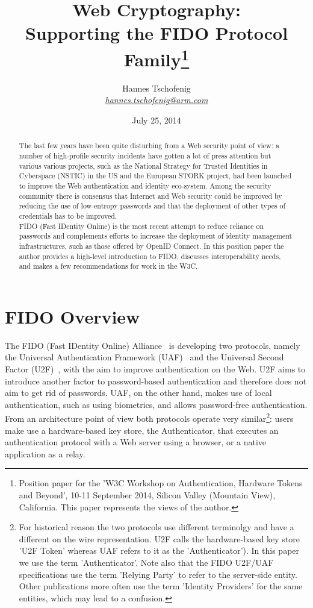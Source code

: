 \documentclass[peerreview, a4paper, 7pt]{IEEEtran}
\title{Web Cryptography: \\Supporting the FIDO Protocol Family\thanks{Position paper for the 'W3C Workshop on Authentication, Hardware Tokens and Beyond', 10-11 September 2014, Silicon Valley (Mountain View), California. This paper represents the views of the author.}}
\author{Hannes Tschofenig\\\textit{\href{mailto:hannes.tschofenig@arm.com}{hannes.tschofenig@arm.com}}}
\date{July 25, 2014}
\begin{document}
\maketitle


\begin{abstract}

The last few years have been quite disturbing from a Web security point of view: a number of high-profile security incidents have gotten a lot
of press attention but various various projects, such as the National Strategy for Trusted Identities in Cyberspace (NSTIC) in the US and the 
European STORK project, had been launched to improve the Web authentication and identity eco-system. Among the security community there is 
consensus that Internet and Web security could be improved by reducing the use of low-entropy passwords and that the deployment of other 
types of credentials has to be improved. \\

FIDO (Fast IDentity Online) is the most recent attempt to reduce reliance on passwords and complements efforts to increase the deployment of 
identity management infrastructures, such as those offered by OpenID Connect. In this position paper the author provides a high-level 
introduction to FIDO, discusses interoperability needs, and makes a few recommendations for work in the W3C. 

\end{abstract}

\section{FIDO Overview}

The FIDO (Fast IDentity Online) Alliance~\cite{fido} is developing two protocols, namely the Universal Authentication Framework (UAF)~\cite{uaf} and the Universal Second Factor (U2F)~\cite{u2f}, with the aim to improve authentication on the Web. U2F aims to introduce another factor to password-based authentication and therefore does not aim to get rid of passwords. UAF, on the other hand, makes use of local authentication, such as using biometrics, and allows password-free authentication. From an architecture point of view both protocols operate very similar\footnote{For historical reason the two protocols use different terminolgy and have a different on the wire representation. U2F calls the hardware-based key store 'U2F Token' whereas UAF refers to it as the 'Authenticator'). In this paper we use the term 'Authenticator'. Note also that the FIDO U2F/UAF specifications use the term 'Relying Party' to refer to the server-side entity. Other publications more often use the term 'Identity Providers' for the same entities, which may lead to a confusion.}: users make use a hardware-based key store, the Authenticator, that executes an authentication protocol with a Web server using a browser, or a native application as a relay. 
\end{document}
